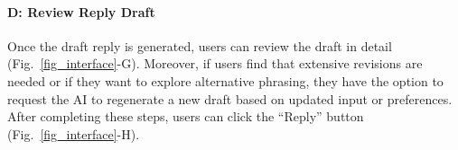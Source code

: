 \paragraph{\textbf{D: Review Reply Draft}}
Once the draft reply is generated, users can review the draft in detail (Fig.~\ref{fig_interface}-G).
Moreover, if users find that extensive revisions are needed or if they want to explore alternative phrasing, they have the option to request the AI to regenerate a new draft based on updated input or preferences.
After completing these steps, users can click the ``Reply'' button (Fig.~\ref{fig_interface}-H).